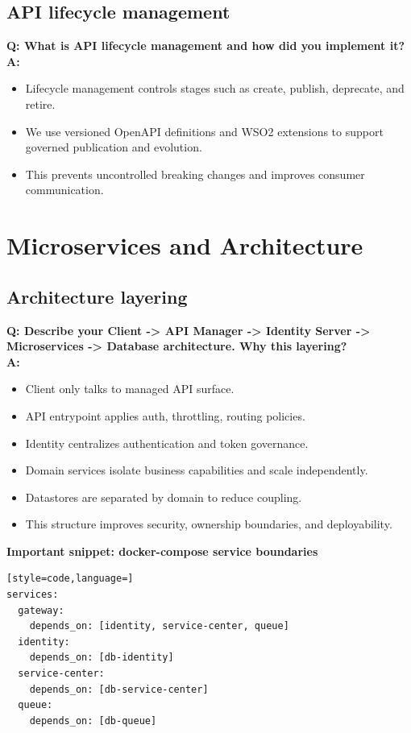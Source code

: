 \documentclass[11pt,a4paper]{article}
\begin{document}
\subsection{API lifecycle management}
\textbf{Q: What is API lifecycle management and how did you implement it?}\\
\textbf{A:}
\begin{itemize}[leftmargin=*]
  \item Lifecycle management controls stages such as create, publish, deprecate, and retire.
  \item We use versioned OpenAPI definitions and WSO2 extensions to support governed publication and evolution.
  \item This prevents uncontrolled breaking changes and improves consumer communication.
\end{itemize}

\section{Microservices and Architecture}

\subsection{Architecture layering}
\textbf{Q: Describe your Client -> API Manager -> Identity Server -> Microservices -> Database architecture. Why this layering?}\\
\textbf{A:}
\begin{itemize}[leftmargin=*]
  \item Client only talks to managed API surface.
  \item API entrypoint applies auth, throttling, routing policies.
  \item Identity centralizes authentication and token governance.
  \item Domain services isolate business capabilities and scale independently.
  \item Datastores are separated by domain to reduce coupling.
  \item This structure improves security, ownership boundaries, and deployability.
\end{itemize}

\textbf{Important snippet: docker-compose service boundaries}\newline
\begin{lstlisting}[style=code,language=]
services:
  gateway:
    depends_on: [identity, service-center, queue]
  identity:
    depends_on: [db-identity]
  service-center:
    depends_on: [db-service-center]
  queue:
    depends_on: [db-queue]
\end{lstlisting}
\end{document}
